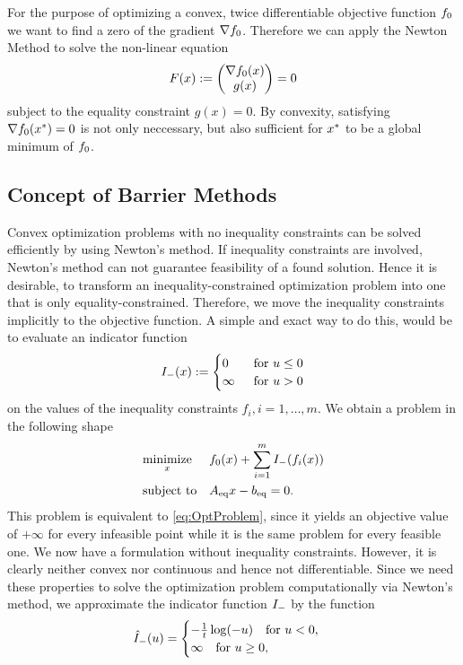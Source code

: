 For the purpose of optimizing a convex, twice differentiable objective function $ f_0 $ we want to find a zero of the gradient $ \nabla f_0 $. Therefore we can apply the Newton Method to solve the non-linear equation \[ F(x) := \begin{pmatrix} {\nabla f_0(x)} \\ {g(x)} \end{pmatrix} = 0 \] subject to the equality constraint $g(x)=0$. By convexity, satisfying $ \nabla f_0 (x^*) = 0$ is not only neccessary, but also sufficient for $ x^* $ to be a global minimum of $ f_0 $.\\


\subsection{Concept of Barrier Methods}
Convex optimization problems with no inequality constraints can  be solved efficiently by using Newton's method. If inequality constraints are involved, Newton's method can not guarantee feasibility of a found solution. Hence it is desirable, to transform an inequality-constrained optimization problem into one that is only equality-constrained. Therefore, we move the inequality constraints implicitly to the objective function.
A simple and exact way to do this, would be to evaluate an  indicator function  
\begin{align}
	{I}_{\mathrm{-}} (x) :=
	\begin{cases}
		0 \quad &\text{for } u \leq 0\\
		\infty &\text{for } u > 0
	\end{cases}
\end{align}
on the values of the inequality constraints $ f_i, i=1,\dots,m $. We obtain a problem in the following shape
\begin{align}
	\begin{aligned}
	& \underset{x}{\text{minimize}}
	& & f_0(x) + \sum_{i=1}^{m} {I}_{\mathrm{-}}(f_i(x))\\
	& \text{subject to}
	& & {A}_{\mathrm{eq}} x - {b}_{\mathrm{eq}} = 0.
	\end{aligned} \label{eq:ifctProblem}
\end{align}
This problem is equivalent to \eqref{eq:OptProblem}, since it yields an objective value of $ +\infty  $ for every infeasible point while it is the same problem for every feasible one. We now have a formulation without inequality constraints. However, it is clearly neither convex nor continuous and hence not differentiable. Since we need these properties to solve the optimization problem computationally via Newton's method, we approximate the indicator function $ {I}_{\mathrm{-}} $ by the function
\begin{equation}
	{\hat{I}}_{\mathrm{-}} (u) =
	\begin{cases}
	 -\frac{1}{t}\log(-u) \quad \text{for } u < 0,\\
	 \infty \quad \text{for } u\geq 0,
	\end{cases}
\end{equation}
